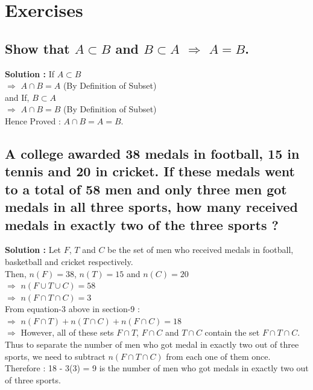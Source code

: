 \documentclass[12pt, letterpaper]{article}
\begin{document}
\section{Exercises}

\subsection{Show that $A \subset B$ and $B \subset A$ $\Rightarrow$ $A = B$.}
\textbf{Solution : }If $A \subset B$ \\
$\Rightarrow$ $A \cap B = A$ (By Definition of Subset) \\
and If, $B \subset A$ \\
$\Rightarrow$ $A \cap B = B$ (By Definition of Subset) \\
Hence Proved : $A \cap B = A = B$.

\subsection{A college awarded 38 medals in football, 15 in tennis and 20 in cricket. If these medals went to a total of 58 men and only three men got medals in all three sports, how many received medals in exactly two of the three sports ?}
\textbf{Solution : }Let $F$, $T$ and $C$ be the set of men who received medals in football, basketball and cricket respectively.\\
Then, $n(F) = 38$, $n(T) = 15$ and $n(C) = 20$\\
$\Rightarrow$ $n(F \cup T \cup C) = 58$ \\
$\Rightarrow$ $n(F \cap T \cap C) = 3$ \\ 
From equation-3 above in section-9 : \\
$\Rightarrow$ $n(F \cap T) + n(T \cap C) + n(F \cap C) = 18$ \\
$\Rightarrow$ However, all of these sets $F \cap T$, $F \cap C$ and $T \cap C$ contain the set $F \cap T \cap C$.\\ 
Thus to separate the number of men who got medal in exactly two out of three sports, we need to subtract $n(F \cap T \cap C)$ from each one of them once.\\
Therefore : 18 - 3(3) = 9 is the number of men who got medals in exactly two out of three sports.
\end{document}
